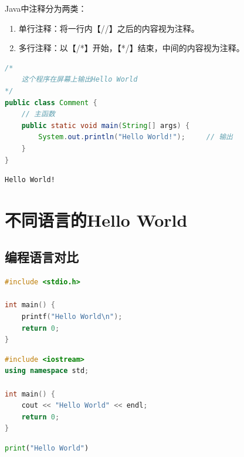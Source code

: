 Java中注释分为两类：

\begin{enumerate}
	\item 单行注释：将一行内【//】之后的内容视为注释。
	\item 多行注释：以【/*】开始，【*/】结束，中间的内容视为注释。
\end{enumerate}


\begin{lstlisting}[language=Java]
/*
	这个程序在屏幕上输出Hello World
*/
public class Comment {
	// 主函数
	public static void main(String[] args) {
		System.out.println("Hello World!");		// 输出
	}
}
\end{lstlisting}

\begin{tcolorbox}
	\begin{verbatim}
Hello World!
	\end{verbatim}
\end{tcolorbox}

\newpage

\section{不同语言的Hello World}

\subsection{编程语言对比}


\begin{lstlisting}[language=C]
#include <stdio.h>

int main() {
	printf("Hello World\n");
	return 0;
}
\end{lstlisting}

\vspace{0.5cm}


\begin{lstlisting}[language=C++]
#include <iostream>
using namespace std;

int main() {
	cout << "Hello World" << endl;
	return 0;
}
\end{lstlisting}

\vspace{0.5cm}


\begin{lstlisting}[language=Python]
print("Hello World")
\end{lstlisting}

\newpage